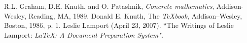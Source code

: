 \begin{thebibliography}{9}

R.L. Graham, D.E. Knuth, and O. Patashnik, \emph{Concrete
mathematics}, Addison-Wesley, Reading, MA, 1989.
Donald E. Knuth, The \emph{TeXbook}, Addison–Wesley, Boston, 1986, p. 1.
Leslie Lamport (April 23, 2007). ``The Writings of Leslie Lamport: \emph{LaTeX: A Document Preparation System".}


\end{thebibliography}
